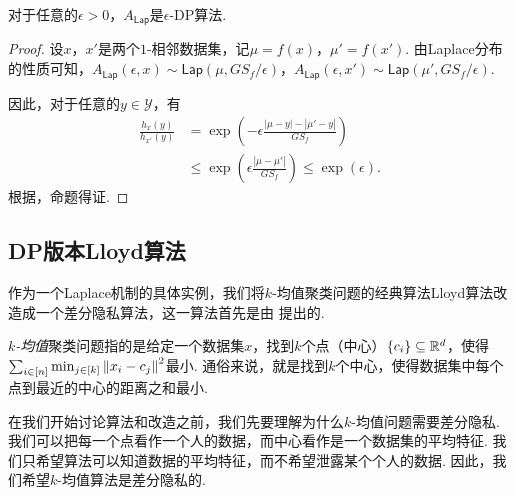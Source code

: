 \begin{theorem}\label{theorem:laplace-mechanism}
    对于任意的$\epsilon > 0$，$A_{\mathsf{Lap}}$是$\epsilon$-DP算法.
\end{theorem}
\begin{proof}
设$x$，$x'$是两个$1$-相邻数据集，记$\mu = f(x)$，$\mu' = f(x')$. 由Laplace分布的性质可知，$A_{\mathsf{Lap}}(\epsilon, x) \sim \mathsf{Lap}(\mu, GS_f/\epsilon)$，$A_{\mathsf{Lap}}(\epsilon, x') \sim \mathsf{Lap}(\mu', GS_f/\epsilon)$.

因此，对于任意的$y \in \mathcal Y$，有
    \[
    \begin{aligned}
        \frac{h_{x}(y)}{h_{x'}(y)} &=\exp \left(-\epsilon \frac{|\mu - y| - |\mu' - y|}{GS_f} \right) \\
        &\leq \exp \left(\epsilon \frac{|\mu - \mu'|}{GS_f} \right)\leq \exp(\epsilon).
    \end{aligned}
    \]
根据，命题得证. 
\end{proof}

\subsection{DP版本Lloyd算法}
作为一个Laplace机制的具体实例，我们将$k$-均值聚类问题的经典算法Lloyd算法改造成一个差分隐私算法，这一算法首先是由 \cite{suDifferentiallyPrivateKMeans2016} 提出的.

\textit{$k$-均值}聚类问题指的是给定一个数据集$x$，找到$k$个点（中心）$\{c_i\} \subseteq \mathbb{R}^d$，使得$\sum_{i \in [n]} \min_{j\in[k]} \left\|x_i - c_j\right\|^2$最小. 通俗来说，就是找到$k$个中心，使得数据集中每个点到最近的中心的距离之和最小. 

在我们开始讨论算法和改造之前，我们先要理解为什么$k$-均值问题需要差分隐私. 我们可以把每一个点看作一个人的数据，而中心看作是一个数据集的平均特征. 我们只希望算法可以知道数据的平均特征，而不希望泄露某个个人的数据. 因此，我们希望$k$-均值算法是差分隐私的.

